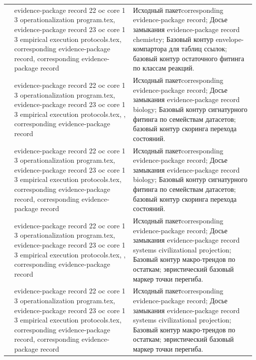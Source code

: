 \begin{longtable}{@{}L{0.16\textwidth}L{0.38\textwidth}L{0.34\textwidth}@{}}
 & evidence-package record 22 oc core 1 3 operationalization program.tex, \allowbreak evidence-package record 23 oc core 1 3 empirical execution protocols.tex, corresponding evidence-package record, corresponding evidence-package record & Исходный пакетcorresponding evidence-package record; Досье замыкания evidence-package record chemistry; Базовый контур envelope-компартора для таблиц ссылок; базовый контур остаточного фитинга по классам реакций. \\
 & evidence-package record 22 oc core 1 3 operationalization program.tex, \allowbreak evidence-package record 23 oc core 1 3 empirical execution protocols.tex, \allowbreak {}, corresponding evidence-package record & Исходный пакетcorresponding evidence-package record; Досье замыкания evidence-package record biology; Базовый контур сигнатурного фитинга по семействам датасетов; базовый контур скоринга перехода состояний. \\
 & evidence-package record 22 oc core 1 3 operationalization program.tex, \allowbreak evidence-package record 23 oc core 1 3 empirical execution protocols.tex, corresponding evidence-package record, corresponding evidence-package record & Исходный пакетcorresponding evidence-package record; Досье замыкания evidence-package record biology; Базовый контур сигнатурного фитинга по семействам датасетов; базовый контур скоринга перехода состояний. \\
 & evidence-package record 22 oc core 1 3 operationalization program.tex, \allowbreak evidence-package record 23 oc core 1 3 empirical execution protocols.tex, \allowbreak {}, corresponding evidence-package record & Исходный пакетcorresponding evidence-package record; Досье замыкания evidence-package record systems civilizational projection; Базовый контур макро-трендов по остаткам; эвристический базовый маркер точки перегиба. \\
 & evidence-package record 22 oc core 1 3 operationalization program.tex, \allowbreak evidence-package record 23 oc core 1 3 empirical execution protocols.tex, corresponding evidence-package record, corresponding evidence-package record & Исходный пакетcorresponding evidence-package record; Досье замыкания evidence-package record systems civilizational projection; Базовый контур макро-трендов по остаткам; эвристический базовый маркер точки перегиба. \\

\end{longtable}
